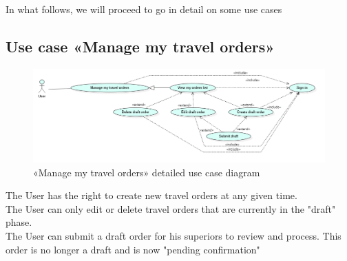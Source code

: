 In what follows, we will proceed to go in detail on some use cases\\
\subsection*{Use case «Manage my travel orders»}
\begin{figure}[H]
    \begin{center}
        \includegraphics[scale=0.44]{img/sprint3_user_manage_usecase.png}
        \caption{«Manage my travel orders» detailed use case diagram}
    \end{center}
        \label{fig:my_label}
\end{figure} 
The User has the right to create new travel orders at any given time.\\
The User can only edit or delete travel orders that are currently in the "draft" phase.\\
The User can submit a draft order for his superiors to review and process. This order is no longer a draft and is now "pending confirmation"

